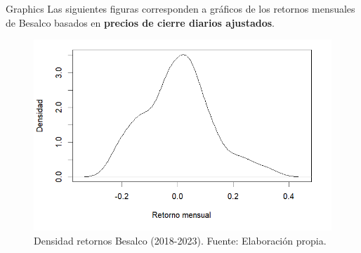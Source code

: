 \documentclass[10pt]{beamer}
\begin{document}
\begin{frame}{Graphics}
        \justifying
        Las siguientes figuras corresponden a gráficos de los retornos mensuales de Besalco basados en \textbf{precios de cierre diarios ajustados}.\\
        
\begin{figure}[H]
\centering
\includegraphics[scale=0.5]{figuras/FIGURA_02_03}
{\footnotesize
\caption{Densidad retornos Besalco (2018-2023). Fuente: Elaboración propia.}
}
\label{figura02}
\end{figure}
\end{frame}
\end{document}

